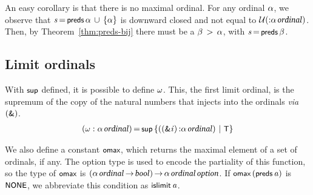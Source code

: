 \documentclass[11pt]{llncs}
\renewcommand{\HOLConst}[1]{{\textsf{\upshape\small #1}}}
\renewcommand{\HOLTyOp}[1]{\mbox{\fontencoding{T1}\fontfamily{bch}\fontseries{m}\fontshape{it}\fontsize{9.5}{10}\selectfont #1}}
\renewcommand{\HOLinline}[1]{\ensuremath{#1}}
\newenvironment{holmath}{\begin{displaymath}\begin{array}{l}}{\end{array}\end{displaymath}\ignorespacesafterend}
\begin{document}
An easy corollary is that there is no maximal ordinal.
For any ordinal \HOLinline{\HOLFreeVar{\ensuremath{\alpha}}}, we observe that \HOLinline{\HOLFreeVar{s}\,{\ensuremath{=}}\,\HOLConst{preds}\,\HOLFreeVar{\ensuremath{\alpha}}\,\HOLTokenUnion{}\,\ensuremath{{\{}}\HOLFreeVar{\ensuremath{\alpha}}\ensuremath{{\}}}} is downward closed  and not equal to \HOLinline{\ensuremath{\cal{U}}(\ensuremath{{:}}\ensuremath{\alpha}\,\HOLTyOp{ordinal})}.
Then, by Theorem~\ref{thm:preds-bij} there must be a \HOLinline{\HOLFreeVar{\ensuremath{\beta}}\,\HOLTokenGt{}\,\HOLFreeVar{\ensuremath{\alpha}}}, with \HOLinline{\HOLFreeVar{s}\,{\ensuremath{=}}\,\HOLConst{preds}\,\HOLFreeVar{\ensuremath{\beta}}}.

\subsection{Limit ordinals}

\begin{definition}\label{defn:omega-def}
With \HOLinline{\HOLConst{sup}} defined, it is possible to define \HOLinline{\HOLConst{\ensuremath{\omega}}}.
This, the first limit ordinal, is the supremum of the copy of the natural numbers that injects into the ordinals \emph{via} \HOLinline{(\HOLConst{\HOLConst{\&}})}.
\begin{holmath}
(\HOLConst{\ensuremath{\omega}} :\ensuremath{\alpha}\,\HOLTyOp{ordinal})\,{\ensuremath{=}}\,\HOLConst{sup}\,\ensuremath{{\{}}((\HOLConst{\&}\HOLBoundVar{i})\,\ensuremath{{:}}\ensuremath{\alpha}\,\HOLTyOp{ordinal})\,\ensuremath{{\,\mid\,}}\,\HOLConst{T}\ensuremath{{\}}}
\end{holmath}
\end{definition}

\begin{definition}
We also define a constant \HOLinline{\HOLConst{omax}}, which returns the maximal element of a set of ordinals, if any.
The \HOLTyOp{option} type is used to encode the partiality of this function, so the type of \HOLinline{\HOLConst{omax}} is \HOLinline{(\ensuremath{\alpha}\,\HOLTyOp{ordinal}\,\ensuremath{{\rightarrow}}\,\HOLTyOp{bool})\,\ensuremath{{\rightarrow}}\,\ensuremath{\alpha}\,\HOLTyOp{ordinal}\,\HOLTyOp{option}}.
If \HOLinline{\HOLConst{omax}\,(\HOLConst{preds}\,\HOLFreeVar{a})} is \HOLinline{\HOLConst{NONE}}, we abbreviate this condition as \HOLinline{\HOLConst{islimit}\,\HOLFreeVar{a}}.
\end{definition}
\end{document}
